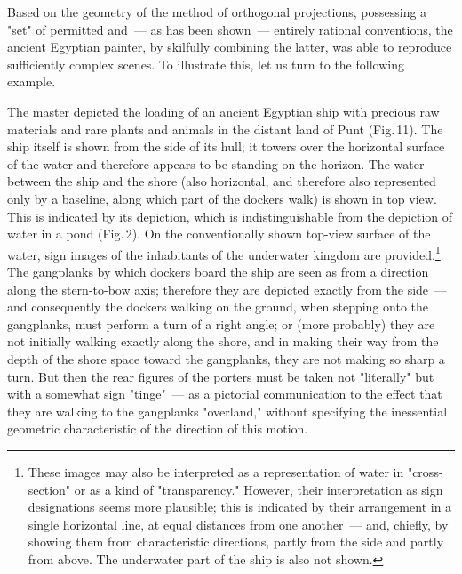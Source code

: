 

Based on the geometry of the method of orthogonal projections, possessing a "set" of
permitted and~--- as has been shown~--- entirely rational conventions, the ancient Egyptian
painter, by skilfully combining the latter, was able to reproduce sufficiently complex
scenes. To illustrate this, let us turn to the following example.

The master depicted the loading of an ancient Egyptian ship with precious raw materials
and rare plants and animals in the distant land of Punt (Fig.\,11). The ship itself is
shown from the side of its hull; it towers over the horizontal surface of the water and
therefore appears to be standing on the horizon. The water between the ship and the
shore (also horizontal, and therefore also represented only by a baseline, along which
part of the dockers walk) is shown in top view. This is indicated by its depiction, which
is indistinguishable from the depiction of water in a pond (Fig.\,2). On the conventionally
shown top-view surface of the water, sign images of the inhabitants of the underwater
kingdom are provided.\footnote{%
  These images may also be interpreted as a representation of water in "cross-section"
  or as a kind of "transparency." However, their interpretation as sign designations
  seems more plausible; this is indicated by their arrangement in a single horizontal
  line, at equal distances from one another~--- and, chiefly, by showing them from
  characteristic directions, partly from the side and partly from above. The
  underwater part of the ship is also not shown.}
The gangplanks by which dockers board the ship are seen as from a direction along the
stern-to-bow axis; therefore they are depicted exactly from the side~--- and consequently
the dockers walking on the ground, when stepping onto the gangplanks, must perform
a turn of a right angle; or (more probably) they are not initially walking exactly along
the shore, and in making their way from the depth of the shore space toward the
gangplanks, they are not making so sharp a turn. But then the rear figures of the porters
must be taken not "literally" but with a somewhat sign "tinge"~--- as a pictorial
communication to the effect that they are walking to the gangplanks "overland," without
specifying the inessential geometric characteristic of the direction of this motion.

